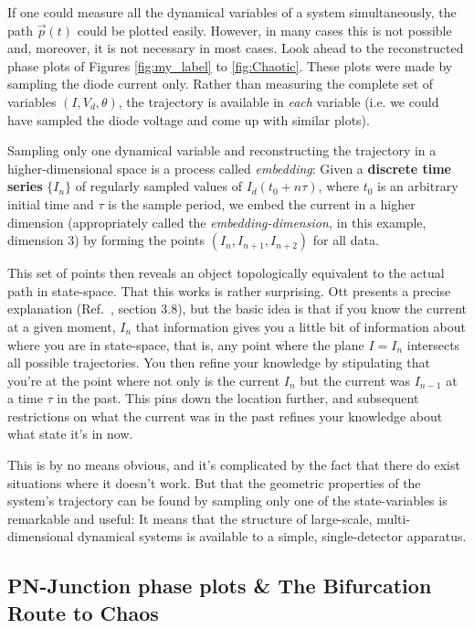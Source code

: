 \documentclass{../lab}
\begin{document}
If one could measure all the dynamical variables of a system simultaneously, the path $\vec p(t)$ could be plotted easily. However, in many cases this is not possible and, moreover, it is not necessary in most cases. Look ahead to the reconstructed phase plots of Figures \ref{fig:my_label} to \ref{fig:Chaotic}. These plots were made by sampling the diode current only. Rather than measuring the complete set of variables $(I, V_d, \theta)$, the trajectory is available in \emph{each} variable (i.e. we could have sampled the diode voltage and come up with similar plots).

Sampling only one dynamical variable and reconstructing the trajectory in a higher-dimensional space is a process called \emph{embedding}: Given a \textbf{discrete time series} $\{I_n\} $ of regularly sampled values of $I_d(t_0 + n\tau)$, where $t_0$ is an arbitrary initial time and $\tau$ is the sample period, we embed the current in a higher dimension (appropriately called the \emph{embedding-dimension,} in this example, dimension 3) by forming the points $(I_n, I_{n+1}, I_{n+2})$ for all data.

This set of points then reveals an object topologically equivalent to the actual path in state-space. That this works is rather surprising. Ott presents a precise explanation (Ref.~\cite{Ott}, section 3.8), but the basic idea is that if you know the current at a given moment, $I_n$ that information gives you a little bit of information about where you are in state-space, that is, any point where the plane $I = I_n$ intersects all possible trajectories. You then refine your knowledge by stipulating that you're at the point where not only is the current $I_n$ but the current was $I_{n-1}$ at a time $\tau$ in the past. This pins down the location further, and subsequent restrictions on what the current was in the past refines your knowledge about what state it's in now.

This is by no means obvious, and it's complicated by the fact that there do exist situations where it doesn't work. But that the geometric properties of the system's trajectory can be found by sampling only one of the state-variables is remarkable and useful: It means that the structure of large-scale, multi-dimensional dynamical systems is available to a simple, single-detector apparatus.

\subsection{PN-Junction phase plots \& The Bifurcation Route to Chaos}
\end{document}
